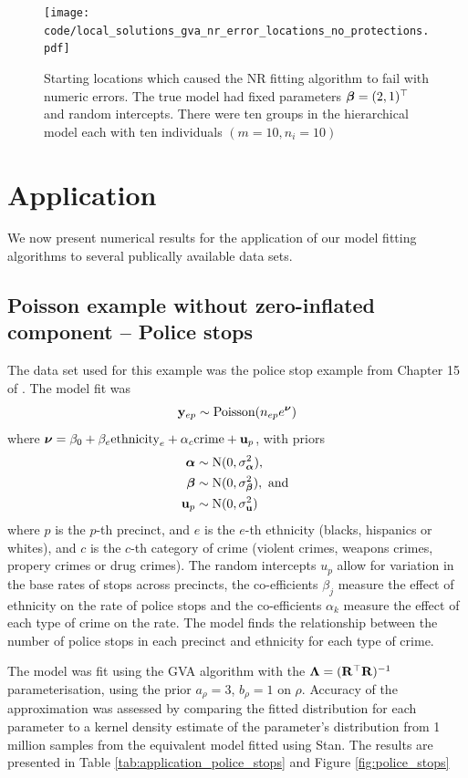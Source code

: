 \begin{figure}[h!]
	\texttt{[image: code/local\_solutions\_gva\_nr\_error\_locations\_no\_protections.pdf]}
	\label{fig:stability_locations_nr}
	\caption{Starting locations which caused the NR fitting algorithm to fail with numeric errors. The true model had fixed parameters ${\boldsymbol \beta} = (2, 1)^\top$ and random intercepts. There were ten groups in the
	hierarchical model each	with ten individuals $(m=10, n_i=10)$}
\end{figure}

\section{Application}
We now present numerical results for the application of our model fitting
algorithms to several publically available data sets.

\label{sec:application}

\subsection{Poisson example without zero-inflated component -- Police stops}
\label{sec:police_stops}
The data set used for this example was the police stop example from Chapter 15 of \cite{Gelman2007}.
The model fit was
$$
	{\bf y}_{ep}        \sim \text{Poisson}(n_{ep} e^{\boldsymbol \nu})
$$
where ${\boldsymbol \nu} = {\beta_0 + \beta_e \text{ethnicity}_e + \alpha_{c} \text{crime} + {\bf u}_p}$, with priors
\begin{align*}
	{\boldsymbol\alpha}				& \sim \text{N}(0, \sigma_{\boldsymbol \alpha}^2),	\\
	{\boldsymbol \beta}        & \sim \text{N}(0, \sigma_{\boldsymbol \beta}^2), \text{ and }\\
	{\bf u}_p         & \sim \text{N}(0, \sigma_{\bf u}^2)
\end{align*}
where $p$ is the $p$-th precinct, and $e$ is the $e$-th ethnicity (blacks,
hispanics or whites), and $c$ is the $c$-th category of crime (violent crimes,
weapons crimes, propery crimes or drug crimes). The random intercepts $u_p$
allow for variation in the base rates of stops across precincts, the
co-efficients $\beta_j$ measure the effect of ethnicity on the rate of police
stops and the co-efficients $\alpha_k$ measure the effect of each type of crime
on the rate. The model finds the relationship between the number of police
stops in each precinct and  ethnicity for each type of crime.

The model was fit using the GVA algorithm with the ${\boldsymbol \Lambda} = ({\bf R}^\top
{\bf R})^{-1}$ parameterisation, using the prior $a_\rho = 3$, $b_\rho = 1$ on
$\rho$. Accuracy of the approximation was assessed by comparing the fitted
distribution for each parameter to a kernel density estimate of the parameter's
distribution from 1 million samples from the equivalent model fitted using
Stan. The results are presented in Table \ref{tab:application_police_stops} and
Figure \ref{fig:police_stops}

